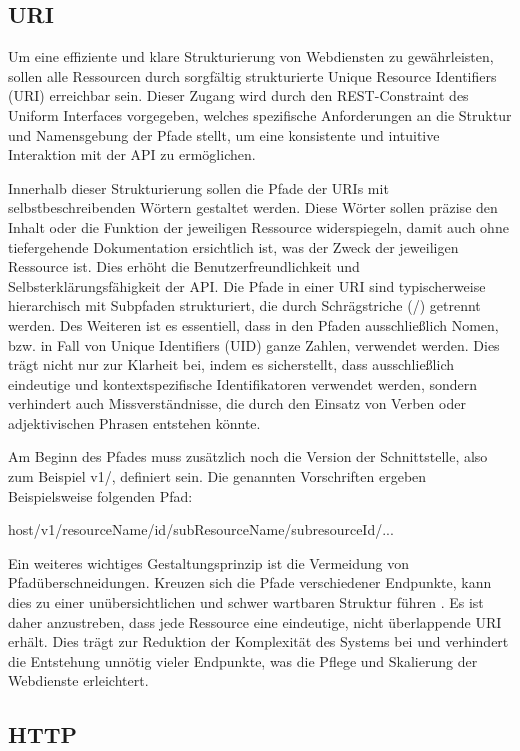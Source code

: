\documentclass[draft,final]{vutinfth} %
\begin{document}
\subsection{URI}

Um eine effiziente und klare Strukturierung von Webdiensten zu gewährleisten, sollen alle Ressourcen durch sorgfältig strukturierte Unique Resource Identifiers (URI) erreichbar sein.
Dieser Zugang wird durch den REST-Constraint des Uniform Interfaces vorgegeben, welches spezifische Anforderungen an die Struktur und Namensgebung der Pfade stellt, um eine konsistente und intuitive Interaktion mit der API zu ermöglichen.

Innerhalb dieser Strukturierung sollen die Pfade der URIs mit selbstbeschreibenden Wörtern gestaltet werden. 
Diese Wörter sollen präzise den Inhalt oder die Funktion der jeweiligen Ressource widerspiegeln, damit auch ohne tiefergehende Dokumentation ersichtlich ist, was der Zweck der jeweiligen Ressource ist. 
Dies erhöht die Benutzerfreundlichkeit und Selbsterklärungsfähigkeit der API.
Die Pfade in einer URI sind typischerweise hierarchisch mit Subpfaden strukturiert, die durch Schrägstriche (\grqq /\grqq ) getrennt werden.
Des Weiteren ist es essentiell, dass in den Pfaden ausschließlich Nomen, bzw. in Fall von Unique Identifiers (UID) ganze Zahlen, verwendet werden. 
Dies trägt nicht nur zur Klarheit bei, indem es sicherstellt, dass ausschließlich eindeutige und kontextspezifische Identifikatoren verwendet werden, sondern verhindert auch Missverständnisse, die durch den Einsatz von Verben oder adjektivischen Phrasen entstehen könnte. \cite{Archip:2018:RestStandards}

Am Beginn des Pfades muss zusätzlich noch die Version der Schnittstelle, also zum Beispiel \grqq v1/\grqq , definiert sein. 
Die genannten Vorschriften ergeben Beispielsweise folgenden Pfad:

host/v1/resourceName/{id}/subResourceName/{subresourceId}/...

Ein weiteres wichtiges Gestaltungsprinzip ist die Vermeidung von Pfadüberschneidungen. 
Kreuzen sich die Pfade verschiedener Endpunkte, kann dies zu einer unübersichtlichen und schwer wartbaren Struktur führen \cite{Archip:2018:RestStandards}. 
Es ist daher anzustreben, dass jede Ressource eine eindeutige, nicht überlappende URI erhält. 
Dies trägt zur Reduktion der Komplexität des Systems bei und verhindert die Entstehung unnötig vieler Endpunkte, was die Pflege und Skalierung der Webdienste erleichtert.


\subsection{HTTP}
\end{document}
